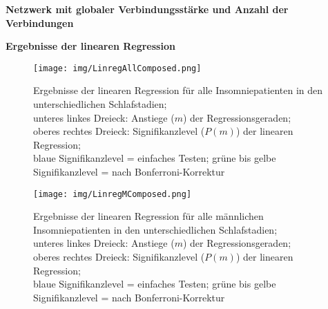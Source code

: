 \textbf{Netzwerk mit globaler Verbindungsstärke und Anzahl der Verbindungen}









\textbf{Ergebnisse der linearen Regression}






\begin{figure}[H]
	\centering
	\texttt{[image: img/LinregAllComposed.png]}
	\caption[Ergebnisse der linearen Regression für alle Insomniepatienten]{Ergebnisse der linearen Regression für alle Insomniepatienten in den unterschiedlichen Schlafstadien;\\unteres linkes Dreieck: Anstiege ($m$) der Regressionsgeraden;\\oberes rechtes Dreieck: Signifikanzlevel ($P(m)$) der linearen Regression;\\blaue Signifikanzlevel = einfaches Testen; grüne bis gelbe Signifikanzlevel = nach Bonferroni-Korrektur}
	\label{fig:LinregAllComposed}
\end{figure}








\begin{figure}[H]
	\centering
	\texttt{[image: img/LinregMComposed.png]}
	\caption[Ergebnisse der linearen Regression für alle männlichen Insomniepatienten]{Ergebnisse der linearen Regression für alle männlichen Insomniepatienten in den unterschiedlichen Schlafstadien;\\unteres linkes Dreieck: Anstiege ($m$) der Regressionsgeraden;\\oberes rechtes Dreieck: Signifikanzlevel ($P(m)$) der linearen Regression;\\blaue Signifikanzlevel = einfaches Testen; grüne bis gelbe Signifikanzlevel = nach Bonferroni-Korrektur}
	\label{fig:LinregMComposed}
\end{figure}





